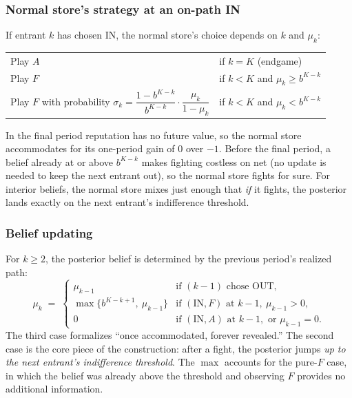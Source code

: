 
\subsubsection*{Normal store's strategy at an on-path IN}

If entrant $k$ has chosen IN, the normal store's choice depends on $k$ and $\mu_k$:
\begin{center}
\begin{tabular}{ll}
  \hline
  Play $A$ & if $k = K$ (endgame) \\
  Play $F$ & if $k < K$ and $\mu_k \ge b^{K-k}$ \\
  Play $F$ with probability $\sigma_k = \dfrac{1 - b^{K-k}}{b^{K-k}} \cdot \dfrac{\mu_k}{1 - \mu_k}$ & if $k < K$ and $\mu_k < b^{K-k}$ \\
  \hline
\end{tabular}
\end{center}
In the final period reputation has no future value, so the normal store accommodates for its one-period gain of $0$ over $-1$. Before the final period, a belief already at or above $b^{K-k}$ makes fighting costless on net (no update is needed to keep the next entrant out), so the normal store fights for sure. For interior beliefs, the normal store mixes just enough that \emph{if} it fights, the posterior lands exactly on the next entrant's indifference threshold.

\subsubsection*{Belief updating}

For $k \ge 2$, the posterior belief is determined by the previous period's realized path:
\[
  \mu_k \;=\; \begin{cases}
    \mu_{k-1} & \text{if } (k-1) \text{ chose OUT,} \\[2pt]
    \max\{b^{K-k+1},\ \mu_{k-1}\} & \text{if } (\text{IN}, F) \text{ at } k-1,\ \mu_{k-1} > 0, \\[2pt]
    0 & \text{if } (\text{IN}, A) \text{ at } k-1, \text{ or } \mu_{k-1} = 0.
  \end{cases}
\]
The third case formalizes ``once accommodated, forever revealed.'' The second case is the core piece of the construction: after a fight, the posterior jumps \emph{up to the next entrant's indifference threshold}. The $\max$ accounts for the pure-$F$ case, in which the belief was already above the threshold and observing $F$ provides no additional information.

